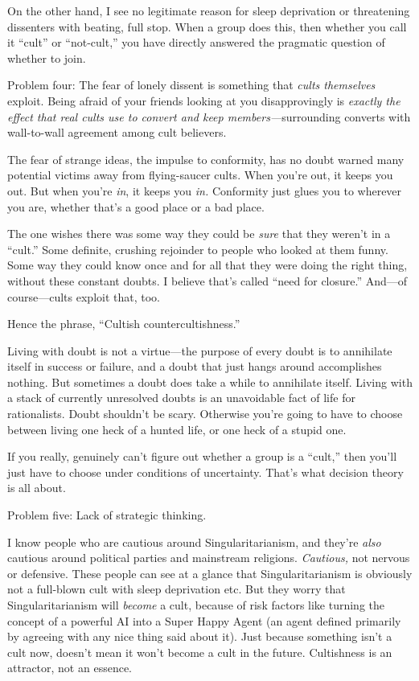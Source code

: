 {
 On the other hand, I see no legitimate reason for sleep
deprivation or threatening dissenters with beating, full stop. When a
group does this, then whether you call it
``cult'' or
``not-cult,'' you have directly
answered the pragmatic question of whether to join.}

{
 Problem four: The fear of lonely dissent is something that
\textit{cults themselves} exploit. Being afraid of your friends looking
at you disapprovingly is \textit{exactly the effect that real cults use
to convert and keep members---}surrounding converts with wall-to-wall
agreement among cult believers.}

{
 The fear of strange ideas, the impulse to conformity, has no doubt
warned many potential victims away from flying-saucer cults. When
you're out, it keeps you out. But when
you're \textit{in}, it keeps you \textit{in.}
Conformity just glues you to wherever you are, whether
that's a good place or a bad place.}

{
 The one wishes there was some way they could be \textit{sure} that
they weren't in a
``cult.'' Some definite, crushing
rejoinder to people who looked at them funny. Some way they could know
once and for all that they were doing the right thing, without these
constant doubts. I believe that's called
``need for closure.'' And---of
course---cults exploit that, too.}

{
 Hence the phrase, ``Cultish
countercultishness.''}

{
 Living with doubt is not a virtue---the purpose of every doubt is
to annihilate itself in success or failure, and a doubt that just hangs
around accomplishes nothing. But sometimes a doubt does take a while to
annihilate itself. Living with a stack of currently unresolved doubts
is an unavoidable fact of life for rationalists. Doubt
shouldn't be scary. Otherwise you're
going to have to choose between living one heck of a hunted life, or
one heck of a stupid one.}

{
 If you really, genuinely can't figure out whether
a group is a ``cult,'' then
you'll just have to choose under conditions of
uncertainty. That's what decision theory is all about.}

{
 Problem five: Lack of strategic thinking.}

{
 I know people who are cautious around Singularitarianism, and
they're \textit{also} cautious around political parties
and mainstream religions. \textit{Cautious,} not nervous or defensive.
These people can see at a glance that Singularitarianism is obviously
not a full-blown cult with sleep deprivation etc. But they worry that
Singularitarianism will \textit{become} a cult, because of risk factors
like turning the concept of a powerful AI into a Super Happy Agent (an
agent defined primarily by agreeing with any nice thing said about it).
Just because something isn't a cult now,
doesn't mean it won't become a cult in
the future. Cultishness is an attractor, not an essence.}

